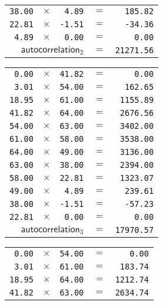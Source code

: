 {\begin{multicols}{2}
\begin{tabular}{rrrrr}
  \texttt{38.00} & $\times$ & \texttt{4.89} & $=$ & \texttt{185.82} \\
  \texttt{22.81} & $\times$ & \texttt{-1.51} & $=$ & \texttt{-34.36} \\
  \texttt{4.89} & $\times$ & \texttt{0.00} & $=$ & \texttt{0.00} \\
  \hline
  \multicolumn{3}{r}{$\textsf{autocorrelation}_2$} & $=$ & \texttt{21271.56} \\
\end{tabular}
\par
\begin{tabular}{rrrrr}
  \texttt{0.00} & $\times$ & \texttt{41.82} & $=$ & \texttt{0.00} \\
  \texttt{3.01} & $\times$ & \texttt{54.00} & $=$ & \texttt{162.65} \\
  \texttt{18.95} & $\times$ & \texttt{61.00} & $=$ & \texttt{1155.89} \\
  \texttt{41.82} & $\times$ & \texttt{64.00} & $=$ & \texttt{2676.56} \\
  \texttt{54.00} & $\times$ & \texttt{63.00} & $=$ & \texttt{3402.00} \\
  \texttt{61.00} & $\times$ & \texttt{58.00} & $=$ & \texttt{3538.00} \\
  \texttt{64.00} & $\times$ & \texttt{49.00} & $=$ & \texttt{3136.00} \\
  \texttt{63.00} & $\times$ & \texttt{38.00} & $=$ & \texttt{2394.00} \\
  \texttt{58.00} & $\times$ & \texttt{22.81} & $=$ & \texttt{1323.07} \\
  \texttt{49.00} & $\times$ & \texttt{4.89} & $=$ & \texttt{239.61} \\
  \texttt{38.00} & $\times$ & \texttt{-1.51} & $=$ & \texttt{-57.23} \\
  \texttt{22.81} & $\times$ & \texttt{0.00} & $=$ & \texttt{0.00} \\
  \hline
  \multicolumn{3}{r}{$\textsf{autocorrelation}_3$} & $=$ & \texttt{17970.57} \\
\end{tabular}
\par
\begin{tabular}{rrrrr}
  \texttt{0.00} & $\times$ & \texttt{54.00} & $=$ & \texttt{0.00} \\
  \texttt{3.01} & $\times$ & \texttt{61.00} & $=$ & \texttt{183.74} \\
  \texttt{18.95} & $\times$ & \texttt{64.00} & $=$ & \texttt{1212.74} \\
  \texttt{41.82} & $\times$ & \texttt{63.00} & $=$ & \texttt{2634.74} \\

\end{tabular}
\end{multicols}}
